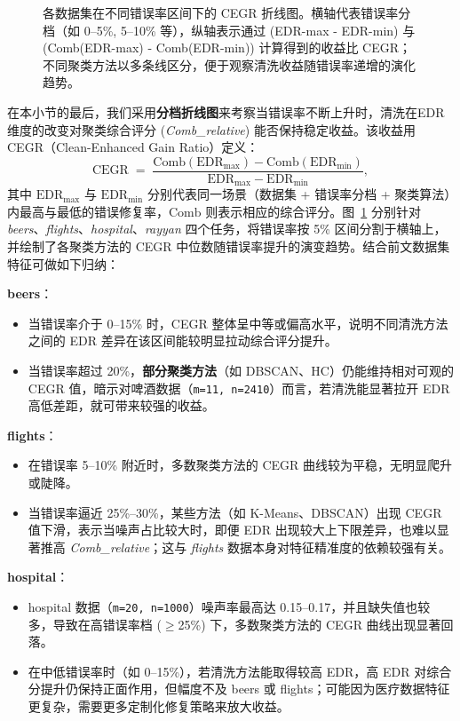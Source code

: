 \documentclass[10pt]{article} %
\numberwithin{equation}{section}
\begin{document}
\begin{enumerate}[label=(\alph*)]
\begin{figure}[htbp]
    \caption{各数据集在不同错误率区间下的 CEGR 折线图。横轴代表错误率分档（如 0--5\%, 5--10\% 等），纵轴表示通过 (EDR-max - EDR-min) 与 (Comb(EDR-max) - Comb(EDR-min)) 计算得到的收益比 CEGR；不同聚类方法以多条线区分，便于观察清洗收益随错误率递增的演化趋势。}
    \label{fig:cegr_lineplots}
\end{figure}
在本小节的最后，我们采用\textbf{分档折线图}来考察当错误率不断上升时，清洗在EDR 维度的改变对聚类综合评分 (\textit{Comb\_relative}) 能否保持稳定收益。该收益用 CEGR（Clean-Enhanced Gain Ratio）定义：
\[
  \mathrm{CEGR} \;=\; \frac{\mathrm{Comb}(\mathrm{EDR}_{\max}) - \mathrm{Comb}(\mathrm{EDR}_{\min})}{\mathrm{EDR}_{\max} - \mathrm{EDR}_{\min}},
\]
其中 \(\mathrm{EDR}_{\max}\) 与 \(\mathrm{EDR}_{\min}\) 分别代表同一场景（数据集 + 错误率分档 + 聚类算法）内最高与最低的错误修复率，\(\mathrm{Comb}\) 则表示相应的综合评分。图~\ref{fig:cegr_lineplots} 分别针对 \textit{beers}、\textit{flights}、\textit{hospital}、\textit{rayyan} 四个任务，将错误率按 5\% 区间分割于横轴上，并绘制了各聚类方法的 CEGR 中位数随错误率提升的演变趋势。结合前文数据集特征可做如下归纳：

\textbf{beers}：
    \begin{itemize}
        \item 当错误率介于 0--15\% 时，CEGR 整体呈中等或偏高水平，说明不同清洗方法之间的 EDR 差异在该区间能较明显拉动综合评分提升。
        \item 当错误率超过 20\%，\textbf{部分聚类方法}（如 DBSCAN、HC）仍能维持相对可观的 CEGR 值，暗示对啤酒数据（\texttt{m=11, n=2410}）而言，若清洗能显著拉开 EDR 高低差距，就可带来较强的收益。
    \end{itemize}

\textbf{flights}：
    \begin{itemize}
        \item 在错误率 5--10\% 附近时，多数聚类方法的 CEGR 曲线较为平稳，无明显爬升或陡降。
        \item 当错误率逼近 25\%--30\%，某些方法（如 K-Means、DBSCAN）出现 CEGR 值下滑，表示当噪声占比较大时，即便 EDR 出现较大上下限差异，也难以显著推高 \textit{Comb\_relative}；这与 \textit{flights} 数据本身对特征精准度的依赖较强有关。
    \end{itemize}

\textbf{hospital}：
    \begin{itemize}
        \item hospital 数据（\texttt{m=20, n=1000}）噪声率最高达 0.15--0.17，并且缺失值也较多，导致在高错误率档 (\(\geq\)25\%) 下，多数聚类方法的 CEGR 曲线出现显著回落。
        \item 在中低错误率时（如 0--15\%），若清洗方法能取得较高 EDR，高 EDR 对综合分提升仍保持正面作用，但幅度不及 beers 或 flights；可能因为医疗数据特征更复杂，需要更多定制化修复策略来放大收益。
    \end{itemize}


\end{enumerate}
\end{document}
